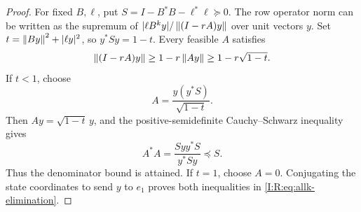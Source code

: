 \begin{proof}
For fixed $B,\ell$, put $S=I-B^*B-\ell^*\ell\succeq0$.  The row
operator norm can be written as the supremum of
$|\ell B^ky|/\left\lVert(I-rA)y\right\rVert$ over unit vectors $y$.  Set
$t=\left\lVert By\right\rVert^2+|\ell y|^2$, so $y^*Sy=1-t$.  Every feasible $A$ satisfies
\[
 \left\lVert(I-rA)y\right\rVert\ge1-r\left\lVert Ay\right\rVert\ge1-r\sqrt{1-t}.
\]
If $t<1$, choose
\[
 A=\frac{y(y^*S)}{\sqrt{1-t}}.
\]
Then $Ay=\sqrt{1-t}\,y$, and the positive-semidefinite
Cauchy--Schwarz inequality gives
\[
 A^*A=\frac{Syy^*S}{y^*Sy}\preceq S.
\]
Thus the denominator bound is attained.  If $t=1$, choose $A=0$.
Conjugating the state coordinates to send $y$ to $e_1$ proves both
inequalities in \eqref{I:R:eq:allk-elimination}.
\end{proof}

